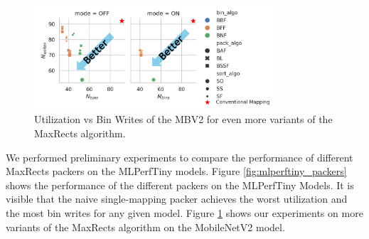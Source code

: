\begin{figure}[htbp]
    \centering
    \includegraphics[width=0.8\textwidth]{images/marp/bssf_types.png}
    \caption{Utilization vs Bin Writes of the MBV2 for even more variants of the MaxRects algorithm.}
    \label{fig:bssf_types}
\end{figure}

We performed preliminary experiments to compare the performance of different MaxRects packers on the MLPerfTiny models. Figure \ref{fig:mlperftiny_packers} shows the performance of the different packers on the MLPerfTiny Models. It is visible that the naive single-mapping packer achieves the worst utilization and the most bin writes for any given model. Figure \ref{fig:bssf_types} shows our experiments on more variants of the MaxRects algorithm on the MobileNetV2 model. 

